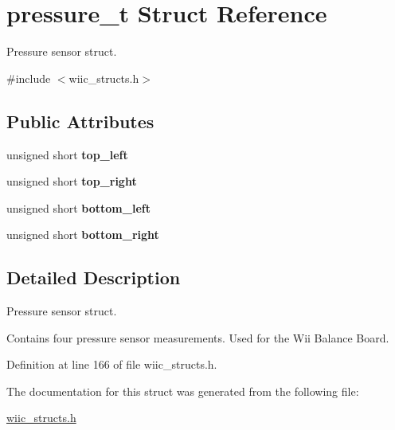 \hypertarget{structpressure__t}{\section{pressure\-\_\-t Struct Reference}
\label{structpressure__t}
}


Pressure sensor struct.  




{\ttfamily \#include $<$wiic\-\_\-structs.\-h$>$}

\subsection*{Public Attributes}
\begin{DoxyCompactItemize}
\item 
\hypertarget{structpressure__t_a167d7a09cc4ad83bd7a09742602fe921}{unsigned short {\bfseries top\-\_\-left}}\label{structpressure__t_a167d7a09cc4ad83bd7a09742602fe921}

\item 
\hypertarget{structpressure__t_a3fa9151be69fe16f0c2b8c920b024b31}{unsigned short {\bfseries top\-\_\-right}}\label{structpressure__t_a3fa9151be69fe16f0c2b8c920b024b31}

\item 
\hypertarget{structpressure__t_a155000ccfe2f110fec14172b065d60e5}{unsigned short {\bfseries bottom\-\_\-left}}\label{structpressure__t_a155000ccfe2f110fec14172b065d60e5}

\item 
\hypertarget{structpressure__t_af2e7e0b2f6433ca8f82fa5ad15b8b1ba}{unsigned short {\bfseries bottom\-\_\-right}}\label{structpressure__t_af2e7e0b2f6433ca8f82fa5ad15b8b1ba}

\end{DoxyCompactItemize}


\subsection{Detailed Description}
Pressure sensor struct. 

Contains four pressure sensor measurements. Used for the Wii Balance Board. 

Definition at line 166 of file wiic\-\_\-structs.\-h.



The documentation for this struct was generated from the following file\-:\begin{DoxyCompactItemize}
\item 
\hyperlink{wiic__structs_8h}{wiic\-\_\-structs.\-h}\end{DoxyCompactItemize}
